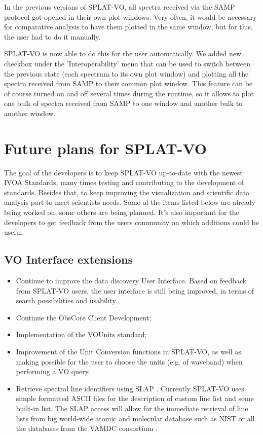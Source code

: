 \documentclass[final,authoryear,5p,times,twocolumn]{elsarticle}
\begin{document}
In the previous versions of SPLAT-VO, all spectra received via the SAMP
protocol got opened in their own plot windows. Very often, it would be
necessary for comparative analysis to have them plotted in the same
window, but for this, the user had to do it manually.

SPLAT-VO is now able to do this
for the user automatically. We added new checkbox under the
'Interoperability' menu that can be used to switch between the previous
state (each spectrum to its own plot window) and plotting all the
spectra received from SAMP to their common plot window. This feature
can be of course turned on and off several times during the runtime,
so it allows to plot one bulk of spectra received from SAMP to one
window and another bulk to another window.

\section{Future plans for SPLAT-VO}

The goal of the developers is to keep SPLAT-VO up-to-date with the
newest IVOA Standards, many times testing and contributing to the
development of standards. Besides that, to keep improving the
visualization and scientific data analysis part to meet scientists
needs.  Some of the items listed below are already being worked on,
some others are being planned. It's also important for the developers
to get feedback from the users community on which additions could be
useful.

\subsection{VO Interface extensions}
\begin{itemize}
\item Continue to improve the data discovery User Interface.
Based on feedback from SPLAT-VO users, the user interface is still being
improved, in terms of search possibilities and usability.
\item Continue the ObsCore Client Development;
\item Implementation of  the VOUnits \citep{vounits} standard;
\item	Improvement of the Unit Conversion functions in SPLAT-VO, as well as making possible for the user to choose the units  (e.g. of waveband) when performing a VO query.
\item Retrieve spectral line identifiers using SLAP \citep[Simple Line
  Access Protocol;][]{slap}. Currently SPLAT-VO uses simple formatted
  ASCII files for the description of custom line list and some
  built-in list. The SLAP access will allow for the immediate
  retrieval of line lists from  big world-wide atomic and molecular
  database such as NIST \citep{NIST_ASD,2012APS..DMP.D1004K,2004JPCRD..33..177L} or all the databases from the
  VAMDC consortium  \citep{2011BaltA..20..503K}.
\end{itemize}
\end{document}
